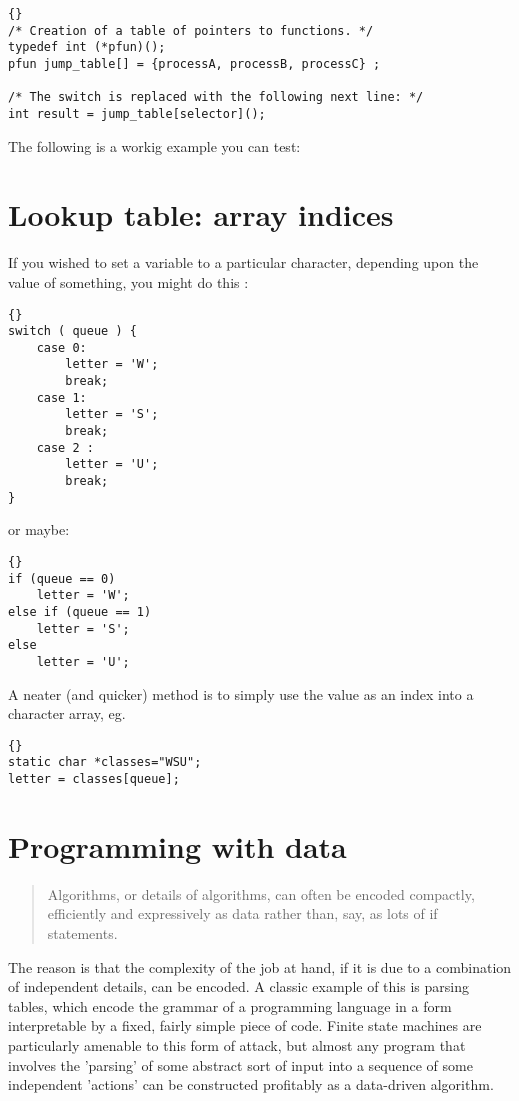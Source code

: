 \documentclass{report}
\begin{document}
\begin{lstlisting}{}
/* Creation of a table of pointers to functions. */
typedef int (*pfun)();
pfun jump_table[] = {processA, processB, processC} ;

/* The switch is replaced with the following next line: */
int result = jump_table[selector]();
\end{lstlisting}

The following is a workig example you can test:




\section{Lookup table: array indices}
If you wished to set a variable to a particular character, depending upon the value of something, you might do this :
\begin{lstlisting}{}
switch ( queue ) {
    case 0:
		letter = 'W';
        break;
    case 1:
		letter = 'S';
        break;
    case 2 :
		letter = 'U';
        break;
}
\end{lstlisting}
or maybe:
\begin{lstlisting}{}
if (queue == 0)
    letter = 'W';
else if (queue == 1)
    letter = 'S';
else
    letter = 'U';
\end{lstlisting}

A neater (and quicker) method is to simply use the value as an index into a character array, eg. 
\begin{lstlisting}{}
static char *classes="WSU";
letter = classes[queue];
\end{lstlisting}


\section{Programming with data}
\begin{quote}
Algorithms, or details of algorithms, can often be encoded compactly, efficiently and expressively as data rather than, say, as lots of if statements.
\end{quote}
The reason is that the complexity of the job at hand, if it is due to a combination of independent details, can be encoded. A classic example of this is parsing tables, which encode the grammar of a programming language in a form interpretable by a fixed, fairly simple piece of code. Finite state machines are particularly amenable to this form of attack, but almost any program that involves the 'parsing' of some abstract sort of input into a sequence of some independent 'actions' can be constructed profitably as a data-driven algorithm.
\end{document}
